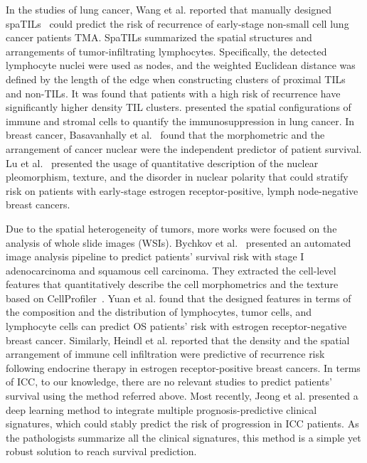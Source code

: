 \documentclass[num-refs]{wiley-article}
\begin{document}
In the studies of lung cancer, Wang et al. reported that manually designed spaTILs~\cite{2013Spatial} could predict the risk of recurrence of early-stage non-small cell lung cancer patients TMA. SpaTILs summarized the spatial structures and arrangements of tumor-infiltrating lymphocytes. Specifically, the detected lymphocyte nuclei were used as nodes, and the weighted Euclidean distance was defined by the length of the edge when constructing clusters of proximal TILs and non-TILs. It was found that patients with a high risk of recurrence have significantly higher density TIL clusters. \cite{AbdulJabbar2020} presented the spatial configurations of immune and stromal cells to quantify the immunosuppression in lung cancer. In breast cancer, Basavanhally et al.~\cite{basavanhally2009computer} found that the morphometric and the arrangement of cancer nuclear were the independent predictor of patient survival. Lu et al.~\cite{2018Nuclear} presented the usage of quantitative description of the nuclear pleomorphism, texture, and the disorder in nuclear polarity that could stratify risk on patients with early-stage estrogen receptor-positive, lymph node-negative breast cancers. 

Due to the spatial heterogeneity of tumors, more works were focused on the analysis of whole slide images (WSIs). Bychkov et al.~\cite{bychkov2018deep} presented an automated image analysis pipeline to predict patients' survival risk with stage I adenocarcinoma and squamous cell carcinoma. They extracted the cell-level features that quantitatively describe the cell morphometrics and the texture based on CellProfiler~\cite{carpenter2006cellprofiler,kamentsky2011improved}. Yuan et al. \cite{yuan2012quantitative} found that the designed features in terms of the composition and the distribution of lymphocytes, tumor cells, and lymphocyte cells can predict OS patients' risk with estrogen receptor-negative breast cancer. Similarly, Heindl et al. \cite{heindl2018relevance} reported that the density and the spatial arrangement of immune cell infiltration were predictive of recurrence risk following endocrine therapy in estrogen receptor-positive breast cancers. In terms of ICC, to our knowledge, there are no relevant studies to predict patients' survival using the method referred above. Most recently, Jeong et al. \cite{2020Latent} presented a deep learning method to integrate multiple prognosis-predictive clinical signatures, which could stably predict the risk of progression in ICC patients. As the pathologists summarize all the clinical signatures, this method is a simple yet robust solution to reach survival prediction. 
\end{document}
